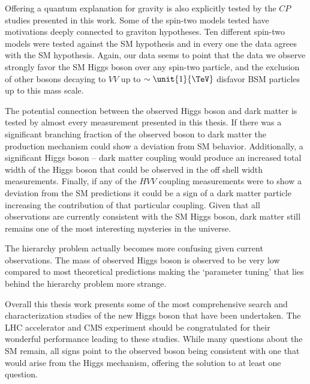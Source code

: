 Offering a quantum explanation for gravity is also explicitly tested by the $CP$ studies presented in this work. Some of the spin-two models tested have motivations deeply connected to graviton hypotheses. Ten different spin-two models were tested against the SM hypothesis and in every one the data agrees with the SM hypothesis. Again, our data seems to point that the data we observe strongly favor the SM Higgs boson over any spin-two particle, and the exclusion of other bosons decaying to $VV$ up to $\sim\unit{1}{\TeV}$ disfavor BSM particles up to this mass scale.

The potential connection between the observed Higgs boson and dark matter is tested by almost every measurement presented in this thesis. If there was a significant branching fraction of the observed boson to dark matter the production mechanism could show a deviation from SM behavior. Additionally, a significant Higgs boson -- dark matter coupling would produce an increased total width of the Higgs boson that could be observed in the off shell width measurements. Finally, if any of the $HVV$ coupling measurements were to show a deviation from the SM predictions it could be a sign of a dark matter particle increasing the contribution of that particular coupling. Given that all observations are currently consistent with the SM Higgs boson, dark matter still remains one of the most interesting mysteries in the universe.

The hierarchy problem actually becomes more confusing given current observations. The mass of observed Higgs boson is observed to be very low compared to most theoretical predictions making the `parameter tuning' that lies behind the hierarchy problem more strange.

Overall this thesis work presents some of the most comprehensive search and characterization studies of the new Higgs boson that have been undertaken. The LHC accelerator and CMS experiment should be congratulated for their wonderful performance leading to these studies. While many questions about the SM remain, all signs point to the observed boson being consistent with one that would arise from the Higgs mechanism, offering the solution to at least one question.